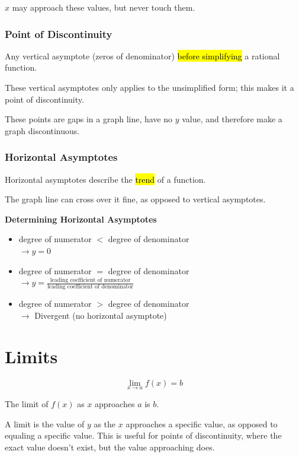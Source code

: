 \documentclass[a4paper,12pt]{article}
\begin{document}
$x$ may approach these values, but never touch them.

\subsubsection{Point of Discontinuity}
Any vertical asymptote (zeros of denominator) \hl{before simplifying} a rational function.

These vertical asymptotes only applies to the unsimplified form; this makes it a point of discontinuity.

These points are gaps in a graph line, have no $y$ value, and therefore make a graph discontinuous.

\subsubsection{Horizontal Asymptotes}
Horizontal asymptotes describe the \hl{trend} of a function.

The graph line can cross over it fine, as opposed to vertical asymptotes.

\textbf{Determining Horizontal Asymptotes}
\begin{itemize}
    \item{degree of numerator $<$ degree of denominator\\$\longrightarrow y = 0$}
    \item{degree of numerator $=$ degree of denominator\\$\longrightarrow y = \frac{\textrm{leading coefficient of numerator}}{\textrm{leading coefficient of denominator}}$}
    \item{degree of numerator $>$ degree of denominator\\$\longrightarrow$ Divergent (no horizontal asymptote)}
\end{itemize}

\pagebreak

\section{Limits}
\Large
$$\lim\limits_{x \to a} f(x) = b$$
\normalsize
\begin{center}
The limit of $f(x)$ as $x$ approaches $a$ is $b$.
\end{center}

A limit is the value of $y$ as the $x$ approaches a specific value, as opposed to equaling a specific value. This is useful for points of discontinuity, where the exact value doesn't exist, but the value approaching does.
\end{document}
